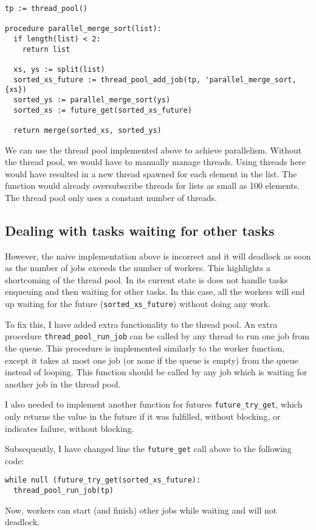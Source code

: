 \begin{verbatim}
tp := thread_pool()

procedure parallel_merge_sort(list):
  if length(list) < 2:
    return list

  xs, ys := split(list)
  sorted_xs_future := thread_pool_add_job(tp, 'parallel_merge_sort, {xs})
  sorted_ys := parallel_merge_sort(ys)
  sorted_xs := future_get(sorted_xs_future)

  return merge(sorted_xs, sorted_ys)
\end{verbatim}

We can use the thread pool implemented above to achieve parallelism. Without the thread pool, we would
have to manually manage threads. Using threads here would have resulted in a new thread spawned for
each element in the list. The function would already oversubscribe threads for lists as small as
100 elements. The thread pool only uses a constant number of threads.

\subsection{Dealing with tasks waiting for other tasks}

However, the naive implementation above is incorrect and it will deadlock as soon as the number of
jobs exceeds the number of workers. This highlights a shortcoming of the thread pool. In its current
state is does not handle tasks enqueuing and then waiting for other tasks. In this case, all the workers
will end up waiting for the future (\verb|sorted_xs_future|) without doing any work.

To fix this, I have added extra functionality to the thread pool. An extra procedure \verb|thread_pool_run_job|
can be called by any thread to run one job from the queue. This procedure is implemented similarly
to the worker function, except it takes at most one job (or none if the queue is empty) from the
queue instead of looping.
This function should be called by any job which is waiting for another job in the thread pool.

I also needed to implement another function for futures \verb|future_try_get|, which only returns the
value in the future if it was fulfilled, without blocking, or indicates failure, without blocking.

Subsequently, I have changed line the \verb|future_get| call above to the following code:
\begin{verbatim}
while null (future_try_get(sorted_xs_future):
  thread_pool_run_job(tp)
\end{verbatim}
Now, workers can start (and finish) other jobs while waiting and will not deadlock.

